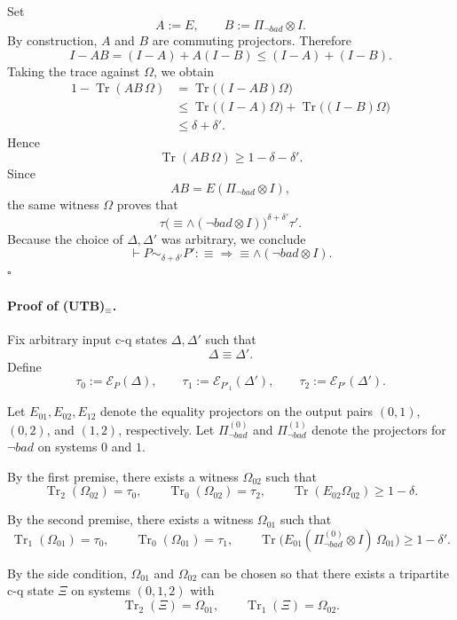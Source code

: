\documentclass{report}
\theoremstyle{defn_style}
\begin{document}
Set
\[
A:=E,
\qquad
B:=\Pi_{\neg bad}\otimes I.
\]
By construction, $A$ and $B$ are commuting projectors. Therefore
\[
I-AB=(I-A)+A(I-B)\le (I-A)+(I-B).
\]
Taking the trace against $\Omega$, we obtain
\begin{align*}
1-\operatorname{Tr}(AB\,\Omega)
&=
\operatorname{Tr}\bigl((I-AB)\Omega\bigr) \\
&\le
\operatorname{Tr}\bigl((I-A)\Omega\bigr)
+
\operatorname{Tr}\bigl((I-B)\Omega\bigr) \\
&\le
\delta+\delta'.
\end{align*}
Hence
\[
\operatorname{Tr}(AB\,\Omega)\ge 1-\delta-\delta'.
\]
Since
\[
AB = E(\Pi_{\neg bad}\otimes I),
\]
the same witness $\Omega$ proves that
\[
\tau \mathrel{\bigl(\equiv \wedge (\neg bad\otimes I)\bigr)^{\delta+\delta'}} \tau'.
\]
Because the choice of $\Delta,\Delta'$ was arbitrary, we conclude
\[
\vdash P \sim_{\delta+\delta'} P' : \equiv \Longrightarrow \equiv \wedge (\neg bad \otimes I).
\]
\hfill$\square$

\paragraph{Proof of \textsc{(UTB)}$_{\equiv}$.}
Fix arbitrary input c-q states $\Delta,\Delta'$ such that
\[
\Delta \mathrel{\equiv} \Delta'.
\]
Define
\[
\tau_0 := \mathcal{E}_{P}(\Delta),
\qquad
\tau_1 := \mathcal{E}_{P'_1}(\Delta'),
\qquad
\tau_2 := \mathcal{E}_{P'}(\Delta').
\]

Let $E_{01},E_{02},E_{12}$ denote the equality projectors on the output pairs
$(0,1)$, $(0,2)$, and $(1,2)$, respectively. Let
$\Pi_{\neg bad}^{(0)}$ and $\Pi_{\neg bad}^{(1)}$ denote the projectors for
$\neg bad$ on systems $0$ and $1$.

By the first premise, there exists a witness $\Omega_{02}$ such that
\[
\operatorname{Tr}_2(\Omega_{02})=\tau_0,
\qquad
\operatorname{Tr}_0(\Omega_{02})=\tau_2,
\qquad
\operatorname{Tr}(E_{02}\Omega_{02})\ge 1-\delta.
\]

By the second premise, there exists a witness $\Omega_{01}$ such that
\[
\operatorname{Tr}_1(\Omega_{01})=\tau_0,
\qquad
\operatorname{Tr}_0(\Omega_{01})=\tau_1,
\qquad
\operatorname{Tr}\bigl(E_{01}(\Pi_{\neg bad}^{(0)}\otimes I)\,\Omega_{01}\bigr)\ge 1-\delta'.
\]

By the side condition, $\Omega_{01}$ and $\Omega_{02}$ can be chosen so that
there exists a tripartite c-q state $\Xi$ on systems $(0,1,2)$ with
\[
\operatorname{Tr}_2(\Xi)=\Omega_{01},
\qquad
\operatorname{Tr}_1(\Xi)=\Omega_{02}.
\]
\end{document}
